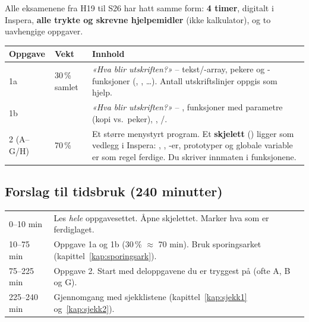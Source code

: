 

Alle eksamenene fra H19 til S26 har hatt samme form: \textbf{4 timer}, digitalt i Inspera,
\textbf{alle trykte og skrevne hjelpemidler} (ikke kalkulator), og to uavhengige oppgaver.

\begin{center}
\begin{tabular}{@{}L{2.3cm}L{1.2cm}L{11.8cm}@{}}
\toprule
\textbf{Oppgave} & \textbf{Vekt} & \textbf{Innhold} \\
\midrule
1a & 30\,\% samlet & \emph{«Hva blir utskriften?»} -- tekst/-array, pekere og -funksjoner (, ,  \dots). Antall utskriftslinjer oppgis som hjelp. \\
1b & & \emph{«Hva blir utskriften?»} -- , funksjoner med parametre (kopi vs.\ peker), , /. \\
2 (A--G/H) & 70\,\% & Et større menystyrt program. Et \textbf{skjelett} () ligger som vedlegg i Inspera: , , -er, prototyper og globale variable er som regel ferdige. Du skriver innmaten i funksjonene. \\
\bottomrule
\end{tabular}
\end{center}

\subsection{Forslag til tidsbruk (240 minutter)}
\begin{tabular}{@{}L{3.2cm}L{12.5cm}@{}}
0--10 min & Les \emph{hele} oppgavesettet. Åpne skjelettet. Marker hva som er ferdiglaget. \\
10--75 min & Oppgave 1a og 1b (30\,\% $\approx$ 70 min). Bruk sporingsarket (kapittel~\ref{kap:sporingsark}). \\
75--225 min & Oppgave 2. Start med deloppgavene du er tryggest på (ofte A, B og G). \\
225--240 min & Gjennomgang med sjekklistene (kapittel~\ref{kap:sjekk1} og~\ref{kap:sjekk2}). \\
\end{tabular}

